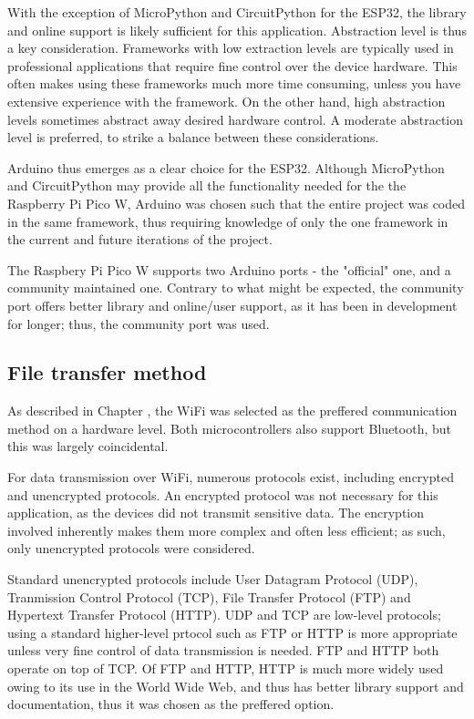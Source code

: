 With the exception of MicroPython and CircuitPython for the ESP32, the library and online support is likely sufficient for this application. Abstraction level is thus a key consideration. Frameworks with low extraction levels are typically used in professional applications that require fine control over the device hardware. This often makes using these frameworks much more time consuming, unless you have extensive experience with the framework. On the other hand, high abstraction levels sometimes abstract away desired hardware control. A moderate abstraction level is preferred, to strike a balance between these considerations.

Arduino thus emerges as a clear choice for the ESP32. Although MicroPython and CircuitPython may provide all the functionality needed for the the Raspberry Pi Pico W, Arduino was chosen such that the entire project was coded in the same framework, thus requiring knowledge of only the one framework in the current and future iterations of the project.

The Raspbery Pi Pico W supports two Arduino ports - the "official" one, and a community maintained one. Contrary to what might be expected, the community port offers better library and online/user support, as it has been in development for longer; thus, the community port was used.

\subsection{File transfer method}

As described in Chapter , the WiFi was selected as the preffered communication method on a hardware level. Both microcontrollers also support Bluetooth, but this was largely coincidental.

For data transmission over WiFi, numerous protocols exist, including encrypted and unencrypted protocols. An encrypted protocol was not necessary for this application, as the devices did not transmit sensitive data. The encryption involved inherently makes them more complex and often less efficient; as such, only unencrypted protocols were considered.

Standard unencrypted protocols include User Datagram Protocol (UDP), Tranmission Control Protocol (TCP), File Transfer Protocol (FTP) and Hypertext Transfer Protocol (HTTP). UDP and TCP are low-level protocols; using a standard higher-level prtocol such as FTP or HTTP is more appropriate unless very fine control of data transmission is needed. FTP and HTTP both operate on top of TCP. Of FTP and HTTP, HTTP is much more widely used owing to its use in the World Wide Web, and thus has better library support and documentation, thus it was chosen as the preffered option.

